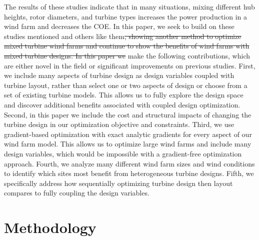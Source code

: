 \documentclass[wes, manuscript]{copernicus}
\providecommand{\DIFadd}[1]{{\protect\color{blue}\uwave{#1}}} %
\providecommand{\DIFdel}[1]{{\protect\color{red}\sout{#1}}}                      %
\providecommand{\DIFaddbegin}{} %
\providecommand{\DIFaddend}{} %
\providecommand{\DIFdelbegin}{} %
\providecommand{\DIFdelend}{} %
\begin{document}
The results of these studies indicate that in many situations, mixing different hub heights, rotor diameters, and turbine types increases the power production in a wind farm and decreases the COE. In this paper, we seek to build on these studies mentioned and others like them\DIFdelbegin \DIFdel{, showing another method to optimize mixed turbine wind farms and continue to show the benefits of wind farms with mixed turbine designs.
In this paper we }\DIFdelend \DIFaddbegin \DIFadd{.
We }\DIFaddend make the following contributions, which are either novel in the field or significant improvements on previous studies.
First, we include many aspects of turbine design as design variables coupled with turbine layout, rather than select one or two aspects of design or choose from a set of existing turbine models. This allows us to fully explore the design space and discover additional benefits associated with coupled design optimization.
Second, in this paper we include the cost and structural impacts of changing the turbine design in our optimization objective and constraints.
Third, we use gradient-based optimization with exact analytic gradients for every aspect of our wind farm model. This allows us to optimize large wind farms and include many design variables, which would be impossible with a gradient-free optimization approach.
Fourth, we analyze many different wind farm sizes and wind conditions to identify which sites most benefit from heterogeneous turbine designs.
Fifth, we specifically address how sequentially optimizing turbine design then layout compares to fully coupling the design variables.








\section{Methodology}
\end{document}
